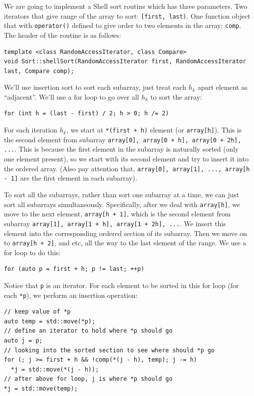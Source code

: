 \documentclass[11pt]{book}
\begin{document}
We are going to implement a Shell sort routine which has three parameters. Two iterators that give range of the array to sort: \texttt{[first, last)}. One function object that with \texttt{operator()} defined to give order to two elements in the array: \texttt{comp}. The header of the routine is as follows:
\begin{verbatim}
template <class RandomAccessIterator, class Compare>
void Sort::shellSort(RandomAccessIterator first, RandomAccessIterator last, Compare comp);
\end{verbatim}
We'll use insertion sort to sort each subarray, just treat each \(h_k\) apart element as ``adjacent''. We'll use a for loop to go over all \(h_k\) to sort the array:
\begin{verbatim}
for (int h = (last - first) / 2; h > 0; h /= 2)
\end{verbatim}

For each iteration \(h_k\), we start at \texttt{*(first + h)} element (or \texttt{array[h]}). This is the second element from subarray \texttt{array[0], array[0 + h], array[0 + 2h], ...}. This is because the first element in the subarray is naturally sorted (only one element present), so we start with its second element and try to insert it into the ordered array. (Also pay attention that, \texttt{array[0], array[1], ..., array[h - 1]} are the first element in each subarray).

To sort all the subarrays, rather than sort one subarray at a time, we can just sort all subarrays simultaneously. Specifically, after we deal with \texttt{array[h]}, we move to the next element, \texttt{array[h + 1]}, which is the second element from subarray \texttt{array[1], array[1 + h], array[1 + 2h], ...}. We insert this element into the corresponding ordered section of its subarray. Then we move on to \texttt{array[h + 2]}, and etc, all the way to the last element of the range. We use a for loop to do this:
\begin{verbatim}
for (auto p = first + h; p != last; ++p)
\end{verbatim}

Notice that \texttt{p} is an iterator. For each element to be sorted in this for loop (for each \texttt{*p}), we perform an insertion operation:
\begin{verbatim}
// keep value of *p
auto temp = std::move(*p);
// define an iterator to hold where *p should go
auto j = p;
// looking into the sorted section to see where should *p go
for (; j >= first + h && !comp(*(j - h), temp); j -= h)
  *j = std::move(*(j - h));
// after above for loop, j is where *p should go
*j = std::move(temp);
\end{verbatim}
\end{document}
